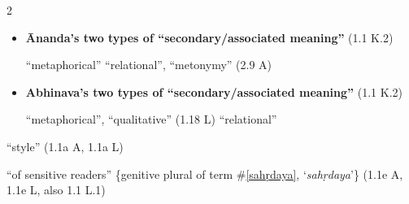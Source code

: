 \documentclass[10pt]{article}
\begin{document}
\begin{multicols}{2}
\begin{enumerate}[
			leftmargin=0em,
			rightmargin=0em,
		]
		\begin{itemize}
			\item \textbf{Ānanda's two types of ``secondary\-/associated meaning''} (1.1 K.2)
			      \begin{enumerate}
				       ``metaphorical''
				       ``relational'', ``metonymy'' (2.9 A)
			      \end{enumerate}

			\item \textbf{Abhinava's two types of ``secondary\-/associated meaning''} (1.1 K.2)
			      \begin{enumerate}
				       ``metaphorical'', ``qualitative'' (1.18 L)
				       ``relational''%
			      \end{enumerate}
		\end{itemize}



		 ``style'' (1.1a A, 1.1a L) %

		 ``of sensitive readers'' \{genitive plural of term \#\ref{sahṛdaya}, `\textit{sahṛdaya}'\} (1.1e A, 1.1e L, also 1.1 L.1)


\end{enumerate}
\end{multicols}
\end{document}
